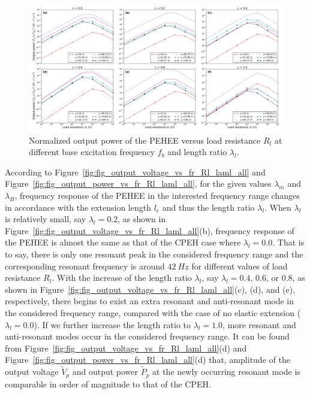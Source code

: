 \documentclass{elsarticle}
\begin{document}
\begin{figure}[!htbp]
    \centering
    \includegraphics[width=\textwidth]{./fig_pow_laml_list_vs_fr_Rl}
    \caption{ Normalized output power of the PEHEE versus load resistance $R_l$ at different base excitation frequency $f_b$ and length ratio $\lambda_l$. }
    \label{fig:fig_pow_laml_list_vs_fr_Rl}
\end{figure}


According to Figure~\ref{fig:fig_output_voltage_vs_fr_Rl_laml_all} and Figure~\ref{fig:fig_output_power_vs_fr_Rl_laml_all}, for the given values $\lambda_m$ and $\lambda_B$, frequency response of the PEHEE in the interested frequency range changes in accordance with the extension length $l_e$ and thus the length ratio $\lambda_l$. When $\lambda_l$ is relatively small, say $\lambda_l = 0.2$, as shown in Figure~\ref{fig:fig_output_voltage_vs_fr_Rl_laml_all}(b), frequency response of the PEHEE is almost the same as that of the CPEH case where $\lambda_l = 0.0$. That is to say, there is only one resonant peak in the considered frequency range and the corresponding resonant frequency is around $42\ Hz$ for different values of load resistance $R_l$. With the increase of the length ratio $\lambda_l$, say $\lambda_l = 0.4$, $0.6$, or $0.8$, as shown in Figure~\ref{fig:fig_output_voltage_vs_fr_Rl_laml_all}(c), (d), and (e), respectively, there begins to exist an extra resonant and anti-resonant mode in the considered frequency range, compared with the case of no elastic extension ($\lambda_l=0.0$). If we further increase the length ratio to $\lambda_l = 1.0$, more resonant and anti-resonant modes occur in the considered frequency range. It can be found from Figure~\ref{fig:fig_output_voltage_vs_fr_Rl_laml_all}(d) and Figure~\ref{fig:fig_output_power_vs_fr_Rl_laml_all}(d) that, amplitude of the output voltage $\tilde{V}_p$ and output power $\tilde{P}_p$ at the newly occurring resonant mode is comparable in order of magnitude to that of the CPEH. 
\end{document}
